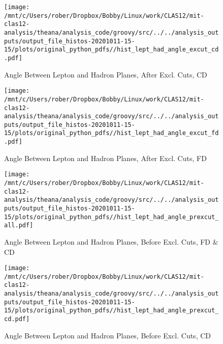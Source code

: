 \documentclass{article}
\begin{document}
\begin{landscape}
    \begin{figure}[h]
        \centering

        \texttt{[image: /mnt/c/Users/rober/Dropbox/Bobby/Linux/work/CLAS12/mit-clas12-analysis/theana/analysis\_code/groovy/src/../../analysis\_outputs/output\_file\_histos-20201011-15-15/plots/original\_python\_pdfs//hist\_lept\_had\_angle\_excut\_cd.pdf]}
        \captionsetup{textformat=empty,labelformat=blank}
        \caption{Angle Between Lepton and Hadron Planes, After Excl. Cuts, CD}
    \end{figure}
    \clearpage
    
    \begin{figure}[h]
        \centering

        \texttt{[image: /mnt/c/Users/rober/Dropbox/Bobby/Linux/work/CLAS12/mit-clas12-analysis/theana/analysis\_code/groovy/src/../../analysis\_outputs/output\_file\_histos-20201011-15-15/plots/original\_python\_pdfs//hist\_lept\_had\_angle\_excut\_fd.pdf]}
        \captionsetup{textformat=empty,labelformat=blank}
        \caption{Angle Between Lepton and Hadron Planes, After Excl. Cuts, FD}
    \end{figure}
    \clearpage
    
    \begin{figure}[h]
        \centering

        \texttt{[image: /mnt/c/Users/rober/Dropbox/Bobby/Linux/work/CLAS12/mit-clas12-analysis/theana/analysis\_code/groovy/src/../../analysis\_outputs/output\_file\_histos-20201011-15-15/plots/original\_python\_pdfs//hist\_lept\_had\_angle\_prexcut\_all.pdf]}
        \captionsetup{textformat=empty,labelformat=blank}
        \caption{Angle Between Lepton and Hadron Planes, Before Excl. Cuts, FD \& CD}
    \end{figure}
    \clearpage
    
    \begin{figure}[h]
        \centering

        \texttt{[image: /mnt/c/Users/rober/Dropbox/Bobby/Linux/work/CLAS12/mit-clas12-analysis/theana/analysis\_code/groovy/src/../../analysis\_outputs/output\_file\_histos-20201011-15-15/plots/original\_python\_pdfs//hist\_lept\_had\_angle\_prexcut\_cd.pdf]}
        \captionsetup{textformat=empty,labelformat=blank}
        \caption{Angle Between Lepton and Hadron Planes, Before Excl. Cuts, CD}
    \end{figure}
    \clearpage
    
    \begin{figure}[h]
        \centering


\end{figure}
\end{landscape}
\end{document}
